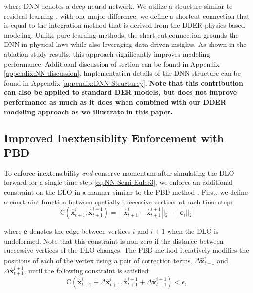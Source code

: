 where $\text{DNN}$ denotes a deep neural network. 
We utilize a structure similar to residual learning \cite{resnet}, with one major difference: we define a shortcut connection that is equal to the integration method that is derived from the DDER physics-based modeling.
Unlike pure learning methods, the short cut connection grounds the DNN in physical laws while also leveraging data-driven insights.
As shown in the ablation study results, this approach significantly improves modeling performance. Additioanl discussion of section can be found in Appendix \ref{appendix:NN discussion}. Implementation details of the DNN structure can be found in Appendix \ref{appendix:DNN Structurey}.
\textbf{Note that this contribution can also be applied to standard DER models, but does not improve performance as much as it does when combined with our DDER modeling approach as we illustrate in this paper.}


\subsection{Improved Inextensiblity Enforcement with PBD}
\label{sec:inextensiblity methodology}
To enforce inextensibility \emph{and} conserve momentum after simulating the DLO forward for a single time step \eqref{eq:NN-Semi-Euler3}, we enforce an additional constraint on the DLO in a manner similar to the PBD method \cite{PBD}. 
First, we define a constraint function between spatially successive vertices at each time step:
\reducevspacebefore
\begin{equation}
    \text{C}(\hat{\textbf{x}}^i_{t+1}, \hat{\textbf{x}}^{i+1}_{t+1}) = | ||\hat{\textbf{x}}^i_{t+1} - \hat{\textbf{x}}^{i+1}_{t+1}||_2 - ||\overline{\textbf{e}}_i||_2 |
    \label{eq:PBD_constraint3}
\end{equation}
\reducevspaceafter

where $\overline{\textbf{e}}$ denotes the edge between vertices $i$ and $i+1$ when the DLO is undeformed.
Note that this constraint is non-zero if the distance between successive vertices of the DLO changes.
The PBD method iteratively modifies the positions of each of the vertex using a pair of correction terms, $\Delta \hat{\textbf{x}}^i_{t+1}$ and $\Delta \hat{\textbf{x}}^{i+1}_{t+1}$, until the following constraint is satisfied: 
\reducevspacebefore
\begin{equation}
    \text{C}(\hat{\textbf{x}}^i_{t+1} + \Delta \hat{\textbf{x}}^i_{t+1}, \hat{\textbf{x}}^{i+1}_{t+1} + \Delta \hat{\textbf{x}}^{i+1}_{t+1}) < \epsilon,
    \label{eq:PBD_constraint4}
\end{equation}
\reducevspaceafter


